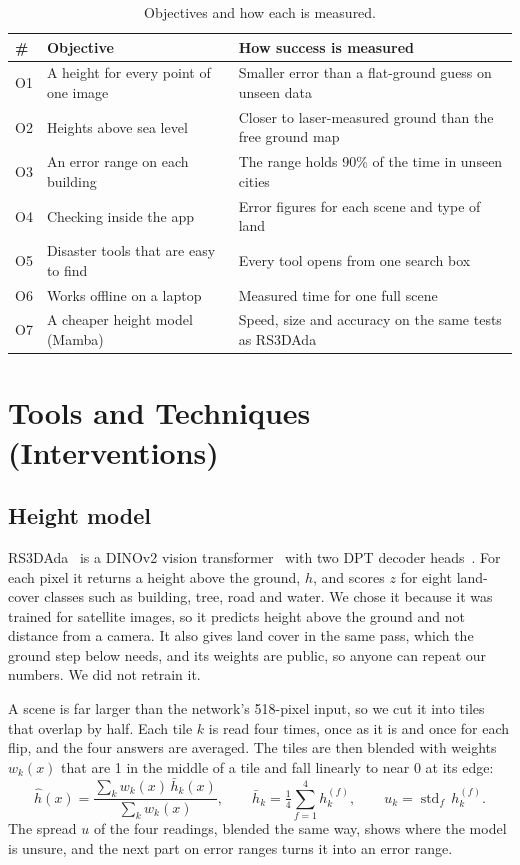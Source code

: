 \documentclass[11pt,a4paper]{article}
\newcommand{\psection}[2]{\section{#1}}
\begin{document}
\begin{table}[!htbp]
\centering\small
\caption{Objectives and how each is measured.}
\label{tab:objectives}
\begin{tabularx}{\linewidth}{@{}lYY@{}}
\toprule
\# & Objective & How success is measured \\
\midrule
O1 & A height for every point of one image & Smaller error than a flat-ground guess on unseen data \\
O2 & Heights above sea level & Closer to laser-measured ground than the free ground map \\
O3 & An error range on each building & The range holds 90\% of the time in unseen cities \\
O4 & Checking inside the app & Error figures for each scene and type of land \\
O5 & Disaster tools that are easy to find & Every tool opens from one search box \\
O6 & Works offline on a laptop & Measured time for one full scene \\
O7 & A cheaper height model (Mamba) & Speed, size and accuracy on the same tests as RS3DAda \\
\bottomrule
\end{tabularx}
\end{table}

\psection{Tools and Techniques (Interventions)}{}
\label{sec:method}

\subsection{Height model}
RS3DAda~\cite{song2024synrs3d} is a DINOv2 vision transformer~\cite{oquab2023dinov2} with two DPT decoder heads~\cite{ranftl2021dpt}. For each pixel it returns a height above the ground, $h$, and scores $z$ for eight land-cover classes such as building, tree, road and water. We chose it because it was trained for satellite images, so it predicts height above the ground and not distance from a camera. It also gives land cover in the same pass, which the ground step below needs, and its weights are public, so anyone can repeat our numbers. We did not retrain it.

A scene is far larger than the network's 518-pixel input, so we cut it into tiles that overlap by half. Each tile $k$ is read four times, once as it is and once for each flip, and the four answers are averaged. The tiles are then blended with weights $w_k(x)$ that are 1 in the middle of a tile and fall linearly to near 0 at its edge:
\begin{equation}
\hat h(x) = \frac{\sum_k w_k(x)\,\bar h_k(x)}{\sum_k w_k(x)}, \qquad
\bar h_k = \tfrac14 \sum_{f=1}^{4} h_k^{(f)}, \qquad
u_k = \operatorname{std}_f\, h_k^{(f)} .
\label{eq:blend}
\end{equation}
The spread $u$ of the four readings, blended the same way, shows where the model is unsure, and the next part on error ranges turns it into an error range.
\end{document}
